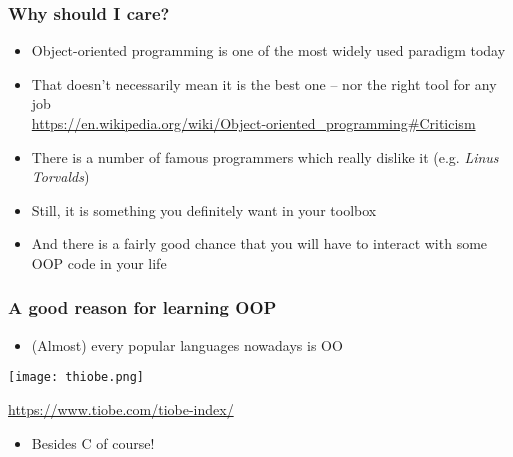 \documentclass[9pt]{beamer}
\begin{document}
\begin{frame}
  \frametitle{Why should I care?}
  
  \begin{itemize}
    \item Object-oriented programming is one of the most widely used paradigm today
    \smallskip
    \item That doesn't necessarily mean it is the best one -- nor the right tool for any job \\
    \tiny
    \url{https://en.wikipedia.org/wiki/Object-oriented_programming\#Criticism}
    \normalsize
    \smallskip
        
    \item There is a number of famous programmers which really dislike it (e.g. \emph{Linus Torvalds})
    \medskip
    \item Still, it is something you definitely want in your toolbox
    \medskip
    \item And there is a fairly good chance that you will have to interact with some OOP
          code in your life
    \smallskip   
  \end{itemize}

\end{frame}


\begin{frame}
  \frametitle{A good reason for learning OOP}
  
  \begin{itemize}
    \item (Almost) every popular languages nowadays is OO
  \end{itemize}
  
  \smallskip
  
  \centering\texttt{[image: thiobe.png]}
  
  \smallskip
  
  \tiny \url{https://www.tiobe.com/tiobe-index/} \normalsize
  
  \smallskip
  
  \begin{itemize}
    \item Besides C of course!
  \end{itemize}
  
\end{frame}
\end{document}
